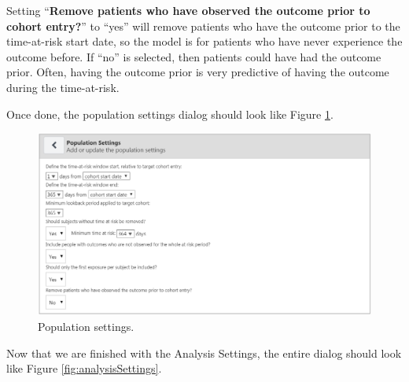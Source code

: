 \documentclass[11pt]{book}
\theoremstyle{definition}
\theoremstyle{definition}
\theoremstyle{definition}
\theoremstyle{remark}
\begin{document}
Setting ``\textbf{Remove patients who have observed the outcome prior to cohort entry?}'' to ``yes'' will remove patients who have the outcome prior to the time-at-risk start date, so the model is for patients who have never experience the outcome before. If ``no'' is selected, then patients could have had the outcome prior. Often, having the outcome prior is very predictive of having the outcome during the time-at-risk.

Once done, the population settings dialog should look like Figure \ref{fig:populationSettings}.

\begin{figure}

{\centering \includegraphics[width=1\linewidth]{images/PatientLevelPrediction/populationSettings} 

}

\caption{Population settings.}\label{fig:populationSettings}
\end{figure}

Now that we are finished with the Analysis Settings, the entire dialog should look like Figure \ref{fig:analysisSettings}.
\end{document}
